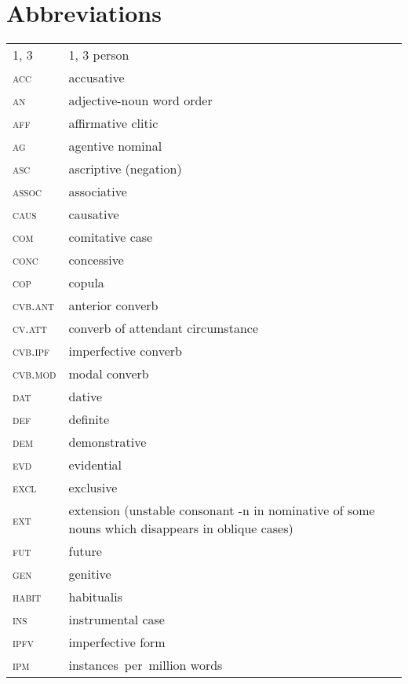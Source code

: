 \documentclass[output=paper]{langsci/langscibook}
\begin{document}
\section*{Abbreviations}
\begin{tabularx}{.45\textwidth}{lQ}
    \textsc{1, 3} & 1, 3 person\\
    \textsc{acc} & accusative\\
    \textsc{an} & adjective-noun word order\\
    \textsc{aff} & affirmative clitic\\
    \textsc{ag} & agentive nominal\\
    \textsc{asc} & ascriptive (negation)\\
    \textsc{assoc} & associative\\
    \textsc{caus} & causative\\
    \textsc{com} & comitative case\\
    \textsc{conc} & concessive\\
    \textsc{cop} & copula\\
    \textsc{cvb.ant} & anterior converb\\
    \textsc{cv.att} & converb of attendant circumstance\\
    \textsc{cvb.ipf} & imperfective converb\\
    \textsc{cvb.mod} & modal converb\\
    \textsc{dat} & dative\\
    \textsc{def} & definite\\
    \textsc{dem} & demonstrative\\
    \textsc{evd} & evidential\\
    \textsc{excl} & exclusive\\
    \textsc{ext} & extension (unstable consonant -n in nominative of some nouns which disappears in oblique cases)\\
    \textsc{fut} & future\\
    \textsc{gen} & genitive\\
    \textsc{habit} & habitualis\\
    \textsc{ins} & instrumental case\\
    \textsc{ipfv} & imperfective form\\
    \textsc{ipm} & instances per million words\\
\end{tabularx}
\end{document}
